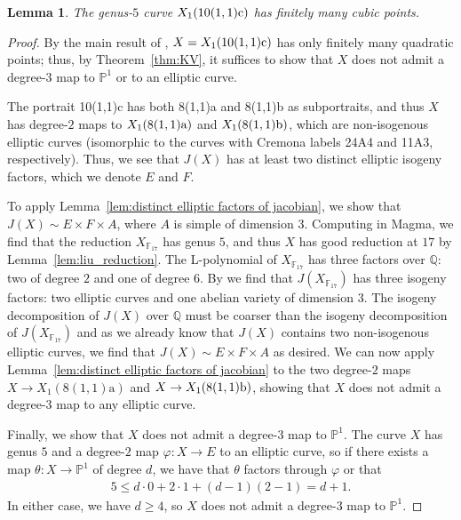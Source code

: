 \documentclass[12pt]{amsart}
\newtheorem{lem}[thm]{Lemma}
\theoremstyle{definition}
\newcommand{\bbF}{\mathbb{F}}
\newcommand{\bbP}{\mathbb{P}}
\numberwithin{equation}{section}
\begin{document}
\begin{lem}\label{lem:no repeated factors example}
    The genus-$5$ curve $X_1(\rm 10(1,1)c)$ has finitely many cubic points.
\end{lem}
\begin{proof}
    By the main result of \cite{doyle/krumm:2024}, $X = X_1({\rm 10(1,1)c})$ has only finitely many quadratic points; thus, by Theorem~\ref{thm:KV}, it suffices to show that $X$ does not admit a degree-$3$ map to $\bbP^1$ or to an elliptic curve.
    
    The portrait 10(1,1)c has both 8(1,1)a and 8(1,1)b as subportraits, and thus $X$ has degree-$2$ maps to $X_1(\rm 8(1,1)a)$ and $X_1(\rm 8(1,1)b)$, which are non-isogenous elliptic curves (isomorphic to the curves with Cremona labels 24A4 and 11A3, respectively). Thus, we see that $J(X)$ has at least two distinct elliptic isogeny factors, which we denote $E$ and $F$.

    To apply Lemma~\ref{lem:distinct elliptic factors of jacobian}, we show that $J(X) \sim E \times F \times A$, where $A$ is simple of dimension $3$. Computing in Magma, we find that the reduction $X_{\bbF_{17}}$ has genus $5$, and thus $X$ has good reduction at $17$ by Lemma~\ref{lem:liu_reduction}. The L-polynomial of $X_{\bbF_{17}}$ has three factors over $\mathbb{Q}$: two of degree $2$ and one of degree $6$. By \cite[Theorem 7]{milne/waterhouse:1969} we find that $J(X_{\bbF_{17}})$ has three isogeny factors: two elliptic curves and one abelian variety of dimension $3$. The isogeny decomposition of $J(X)$ over $\mathbb{Q}$ must be coarser than the isogeny decomposition of $J(X_{\bbF_{17}})$ and as we already know that $J(X)$ contains two non-isogenous elliptic curves, we find that $J(X) \sim E \times F \times A$ as desired.
    We can now apply Lemma~\ref{lem:distinct elliptic factors of jacobian} to the two degree-$2$ maps $X \to X_1(8(1,1)\text{a})$ and $X \to X_1(\rm 8(1,1)b)$, showing that $X$ does not admit a degree-$3$ map to any elliptic curve.

    Finally, we show that $X$ does not admit a degree-$3$ map to $\mathbb{P}^1$. The curve $X$ has genus $5$ and a degree-$2$ map $\varphi:X \to E$ to an elliptic curve, so if there exists a map $\theta: X \to \mathbb{P}^1$ of degree $d$, we have that $\theta$ factors through $\varphi$ or that
    \begin{align*}
        5 \leq d \cdot 0 + 2 \cdot 1 + (d-1)(2-1) = d + 1.
    \end{align*}
    In either case, we have $d \geq 4$, so $X$ does not admit a degree-$3$ map to $\mathbb{P}^1$.
\end{proof}
\end{document}
